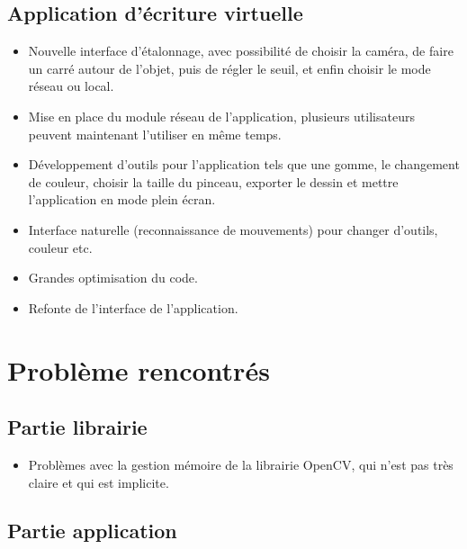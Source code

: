 \documentclass{article}
\begin{document}
		\subsection{Application d'écriture virtuelle}
		\begin{itemize}
		\item Nouvelle interface d'étalonnage, avec possibilité de choisir la caméra, de faire un carré autour de l'objet, 
		puis de régler le seuil, et enfin choisir le mode réseau ou local.
		\item Mise en place du module réseau de l'application, plusieurs utilisateurs peuvent maintenant l'utiliser en même temps.
		\item Développement d'outils pour l'application tels que une gomme, le changement de couleur, choisir la taille
		du pinceau, exporter le dessin et mettre l'application en mode plein écran.
		\item Interface naturelle (reconnaissance de mouvements) pour changer d'outils, couleur etc.
		\item Grandes optimisation du code. 
		\item Refonte de l'interface de l'application.
		\end{itemize}
		
	\section{Problème rencontrés}
		\subsection{Partie librairie}
		\begin{itemize}
		\item Problèmes avec la gestion mémoire de la librairie OpenCV, qui n'est pas très claire et qui est implicite.
		\end{itemize}
		
		\subsection{Partie application}
	
\end{document}
